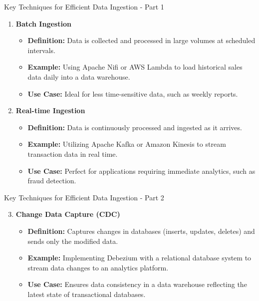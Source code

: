 \documentclass[aspectratio=169]{beamer}
\begin{document}
\begin{frame}[fragile]{Key Techniques for Efficient Data Ingestion - Part 1}
  \begin{enumerate}
    \item \textbf{Batch Ingestion}
      \begin{itemize}
        \item \textbf{Definition:} Data is collected and processed in large volumes at scheduled intervals.
        \item \textbf{Example:} Using Apache Nifi or AWS Lambda to load historical sales data daily into a data warehouse.
        \item \textbf{Use Case:} Ideal for less time-sensitive data, such as weekly reports.
      \end{itemize}
      
    \item \textbf{Real-time Ingestion}
      \begin{itemize}
        \item \textbf{Definition:} Data is continuously processed and ingested as it arrives.
        \item \textbf{Example:} Utilizing Apache Kafka or Amazon Kinesis to stream transaction data in real time.
        \item \textbf{Use Case:} Perfect for applications requiring immediate analytics, such as fraud detection.
      \end{itemize}
  \end{enumerate}
\end{frame}

\begin{frame}[fragile]{Key Techniques for Efficient Data Ingestion - Part 2}
  \begin{enumerate}
    \setcounter{enumi}{2}
    \item \textbf{Change Data Capture (CDC)}
      \begin{itemize}
        \item \textbf{Definition:} Captures changes in databases (inserts, updates, deletes) and sends only the modified data.
        \item \textbf{Example:} Implementing Debezium with a relational database system to stream data changes to an analytics platform.
        \item \textbf{Use Case:} Ensures data consistency in a data warehouse reflecting the latest state of transactional databases.
      \end{itemize}
  \end{enumerate}
\end{frame}
\end{document}
